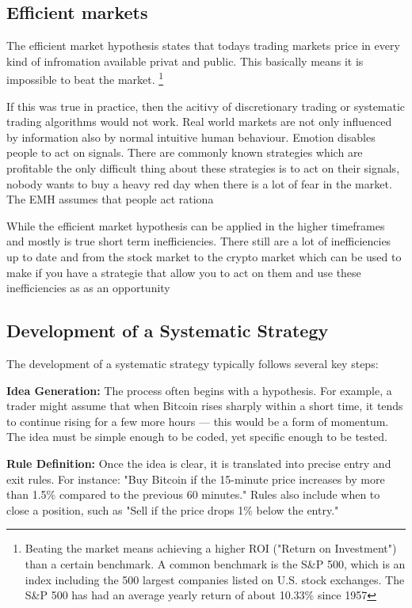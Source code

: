 \documentclass[12pt]{article}
\begin{document}
\newpage
\subsection{Efficient markets}
The efficient market hypothesis states that todays trading markets price in every kind of infromation available privat and public. This basically means it is impossible to beat the market.  \footnote[1]{Beating the market means achieving a higher ROI ("Return on Investment") than a certain benchmark. A common benchmark is the S\&P 500, which is an index including the 500 largest companies listed on U.S. stock exchanges. The S\&P 500 has had an average yearly return of about 10.33\% since 1957}

If this was true in practice, then the acitivy of discretionary trading or systematic trading algorithms would not work.  Real world markets are not only influenced by information also by normal intuitive human behaviour. Emotion disables people to act on signals. There are commonly known strategies which are profitable the only difficult thing about these strategies is to act on their signals, nobody wants to buy a heavy red day when there is a lot of fear in the market. The EMH assumes that people act rationa 

While the efficient market hypothesis can be applied in the higher timeframes and mostly is true short term inefficiencies. There still are a lot of inefficiencies up to date and from the stock market to the crypto market which can be used to make if you have a strategie that allow you to act on them and use these inefficiencies as as an opportunity



\newpage

\subsection{Development of a Systematic Strategy}


The development of a systematic strategy typically follows several key steps:

\textbf{Idea Generation:}  
The process often begins with a hypothesis. For example, a trader might assume that when Bitcoin rises sharply within a short time, it tends to continue rising for a few more hours — this would be a form of momentum. The idea must be simple enough to be coded, yet specific enough to be tested.

\textbf{Rule Definition:}  
Once the idea is clear, it is translated into precise entry and exit rules. For instance: "Buy Bitcoin if the 15-minute price increases by more than 1.5\% compared to the previous 60 minutes." Rules also include when to close a position, such as "Sell if the price drops 1\% below the entry."
\end{document}
